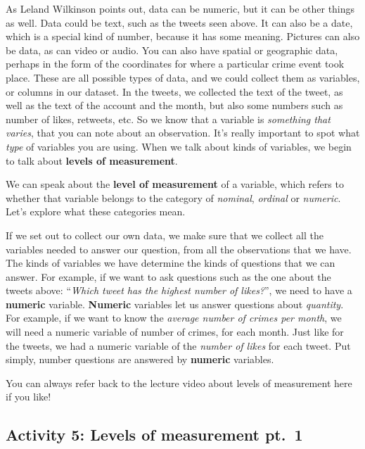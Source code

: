 \documentclass[
]{book}
\begin{document}
As Leland Wilkinson points out, data can be numeric, but it can be other things as well. Data could be text, such as the tweets seen above. It can also be a date, which is a special kind of number, because it has some meaning. Pictures can also be data, as can video or audio. You can also have spatial or geographic data, perhaps in the form of the coordinates for where a particular crime event took place. These are all possible types of data, and we could collect them as variables, or columns in our dataset. In the tweets, we collected the text of the tweet, as well as the text of the account and the month, but also some numbers such as number of likes, retweets, etc. So we know that a variable is \emph{something that varies}, that you can note about an observation. It's really important to spot what \emph{type} of variables you are using. When we talk about kinds of variables, we begin to talk about \textbf{levels of measurement}.

We can speak about the \textbf{level of measurement} of a variable, which refers to whether that variable belongs to the category of \emph{nominal}, \emph{ordinal} or \emph{numeric}. Let's explore what these categories mean.

If we set out to collect our own data, we make sure that we collect all the variables needed to answer our question, from all the observations that we have. The kinds of variables we have determine the kinds of questions that we can answer. For example, if we want to ask questions such as the one about the tweets above: ``\emph{Which tweet has the highest number of likes?}'', we need to have a \textbf{numeric} variable. \textbf{Numeric} variables let us answer questions about \emph{quantity}. For example, if we want to know the \emph{average number of crimes per month}, we will need a numeric variable of number of crimes, for each month. Just like for the tweets, we had a numeric variable of the \emph{number of likes} for each tweet. Put simply, number questions are answered by \textbf{numeric} variables.

You can always refer back to the lecture video about levels of measurement here if you like!

\hypertarget{activity-5-levels-of-measurement-pt.-1}{%
\subsection{Activity 5: Levels of measurement pt.~1}\label{activity-5-levels-of-measurement-pt.-1}}
\end{document}
